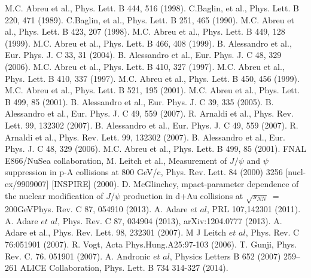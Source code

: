 \begin{thebibliography}{4}
 M.C. Abreu et al., Phys. Lett. B 444, 516 (1998).
 C.Baglin, et al., Phys. Lett. B 220, 471 (1989).
 C.Baglin, et al., Phys. Lett. B 251, 465 (1990). 
M.C. Abreu et al., Phys. Lett. B 423, 207 (1998).
 M.C. Abreu et al., Phys. Lett. B 449, 128 (1999).
 M.C. Abreu et al., Phys. Lett. B 466, 408 (1999). 
 B. Alessandro et al., Eur. Phys. J. C 33, 31 (2004).
 B. Alessandro et al., Eur. Phys. J. C 48, 329 (2006).
 M.C. Abreu et al., Phys. Lett. B 410, 327 (1997).
 M.C. Abreu et al., Phys. Lett. B 410, 337 (1997).
 M.C. Abreu et al., Phys. Lett. B 450, 456 (1999).
 M.C. Abreu et al., Phys. Lett. B 521, 195 (2001).
 M.C. Abreu et al., Phys. Lett. B 499, 85 (2001).
 B. Alessandro et al., Eur. Phys. J. C 39, 335 (2005).
 B. Alessandro et al., Eur. Phys. J. C 49, 559 (2007).
 R. Arnaldi et al., Phys. Rev. Lett. 99, 132302 (2007).
 B. Alessandro et al., Eur. Phys. J. C 49, 559 (2007).
 R. Arnaldi et al., Phys. Rev. Lett. 99, 132302 (2007).
 B. Alessandro et al., Eur. Phys. J. C 48, 329 (2006).
 M.C. Abreu et al., Phys. Lett. B 499, 85 (2001).
 FNAL E866/NuSea collaboration, M. Leitch et al., Measurement of $J/\psi$ and $\psi$ suppression in p-A collisions at 800 GeV/c, Phys. Rev. Lett. 84 (2000) 3256 [nucl-ex/9909007] [INSPIRE] (2000).
 D. McGlinchey, mpact-parameter dependence of the nuclear modification of $J/\psi$ production in d+Au collisions at $\sqrt{s_{NN}}~=$ 200GeVPhys. Rev. C 87, 054910 (2013).
 A. Adare $et$ $al$, PRL 107,142301 (2011). 
 A. Adare $et$ $al$, Phys. Rev. C 87, 034904 (2013),  arXiv:1204.0777 (2013).
 A. Adare et al., Phys. Rev. Lett. 98, 232301 (2007).
 M J Leitch $et$ $al$, Phys. Rev. C 76:051901 (2007).
 R. Vogt, Acta Phys.Hung.A25:97-103 (2006).
 T. Gunji, Phys. Rev. C. 76. 051901 (2007).
 A. Andronic $et$ $al$, Physics Letters B 652 (2007) 259–261 
 ALICE Collaboration, Phys. Lett. B 734 314-327 (2014).  

\end{thebibliography}
